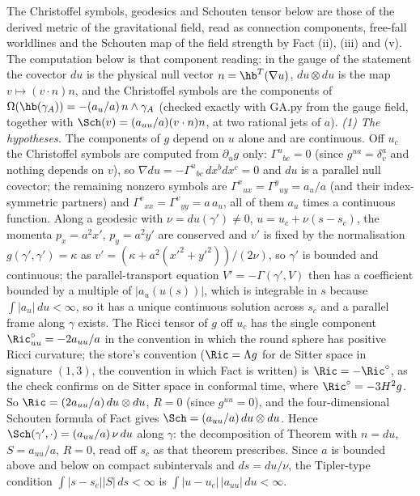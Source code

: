 The Christoffel symbols, geodesics and Schouten tensor below are those of the derived metric of the gravitational field, read as connection components, free-fall worldlines and the Schouten map of the field strength by Fact (ii), (iii) and (v). The computation below is that component reading: in the gauge of the statement the covector $du$ is the physical null vector $n = \hb^{T}(\nabla u)$, $du\otimes du$ is the map $v \mapsto (v\cdot n)n$, and the Christoffel symbols are the components of $\Omega(\hb(\gamma_A)) = -(a_u/a)\,n\wedge\gamma_A$ (checked exactly with GA.py from the gauge field, together with $\Sch(v) = (a_{uu}/a)(v\cdot n)n$, at two rational jets of $a$). \emph{(1) The hypotheses.} The components of $g$ depend on $u$ alone and are continuous. Off $u_c$ the Christoffel symbols are computed from $\partial_u g$ only: $\Gamma^{u}{}_{bc} = 0$ (since $g^{ua} = \delta^a_v$ and nothing depends on $v$), so $\nabla du = -\Gamma^u{}_{bc}\,dx^b dx^c = 0$ and $du$ is a parallel null covector; the remaining nonzero symbols are $\Gamma^x{}_{ux} = \Gamma^y{}_{uy} = a_u/a$ (and their index-symmetric partners) and $\Gamma^v{}_{xx} = \Gamma^v{}_{yy} = a\,a_u$, all of them $a_u$ times a continuous function. Along a geodesic with $\nu = du(\gamma') \neq 0$, $u = u_c + \nu(s - s_c)$, the momenta $p_x = a^2 x'$, $p_y = a^2 y'$ are conserved and $v'$ is fixed by the normalisation $g(\gamma',\gamma') = \kappa$ as $v' = (\kappa + a^2(x'^2 + y'^2))/(2\nu)$, so $\gamma'$ is bounded and continuous; the parallel-transport equation $V' = -\Gamma(\gamma', V)$ then has a coefficient bounded by a multiple of $|a_u(u(s))|$, which is integrable in $s$ because $\int|a_u|\,du < \infty$, so it has a unique continuous solution across $s_c$ and a parallel frame along $\gamma$ exists. The Ricci tensor of $g$ off $u_c$ has the single component $\Ric^{\circ}_{uu} = -2a_{uu}/a$ in the convention in which the round sphere has positive Ricci curvature; the store's convention ($\Ric = \Lambda g$ for de Sitter space in signature $(1,3)$, the convention in which Fact  is written) is $\Ric = -\Ric^{\circ}$, as the check confirms on de Sitter space in conformal time, where $\Ric^{\circ} = -3H^2 g$. So $\Ric = (2a_{uu}/a)\,du\otimes du$, $R = 0$ (since $g^{uu} = 0$), and the four-dimensional Schouten formula of Fact  gives $\Sch = (a_{uu}/a)\,du\otimes du$. Hence $\Sch(\gamma',\cdot) = (a_{uu}/a)\,\nu\,du$ along $\gamma$: the decomposition of Theorem  with $n = du$, $S = a_{uu}/a$, $R = 0$, read off $s_c$ as that theorem prescribes. Since $a$ is bounded above and below on compact subintervals and $ds = du/\nu$, the Tipler-type condition $\int|s - s_c||S|\,ds < \infty$ is $\int|u - u_c|\,|a_{uu}|\,du < \infty$.

